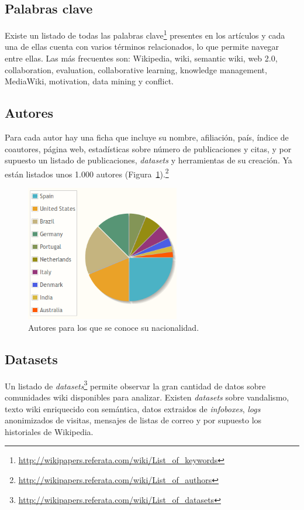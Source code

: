 \documentclass[11pt,onecolumn]{article}
\begin{document}
\subsection{Palabras clave}
Existe un listado de todas las palabras clave\footnote{\href{http://wikipapers.referata.com/wiki/List_of_keywords}{http://wikipapers.referata.com/wiki/List\_of\_keywords}} presentes en los artículos y cada una de ellas cuenta con varios términos relacionados, lo que permite navegar entre ellas. Las más frecuentes son: Wikipedia, wiki, semantic wiki, web 2.0, collaboration, evaluation, collaborative learning, knowledge management, MediaWiki, motivation, data mining y conflict. 

\subsection{Autores}
Para cada autor hay una ficha que incluye su nombre, afiliación, país, índice de coautores, página web, estadísticas sobre número de publicaciones y citas, y por supuesto un listado de publicaciones, \emph{datasets} y herramientas de su creación. Ya están listados unos 1.000 autores (Figura~\ref{fig:autores-tarta}).\footnote{\href{http://wikipapers.referata.com/wiki/List_of_authors}{http://wikipapers.referata.com/wiki/List\_of\_authors}}

\begin{figure}[htb]
\centering
\includegraphics[width=0.6\textwidth]{autores-tarta.png}
\caption{Autores para los que se conoce su nacionalidad.}
\label{fig:autores-tarta}
\end{figure}

\subsection{Datasets}
Un listado de \emph{datasets}\footnote{\href{http://wikipapers.referata.com/wiki/List_of_datasets}{http://wikipapers.referata.com/wiki/List\_of\_datasets}} permite observar la gran cantidad de datos sobre comunidades wiki disponibles para analizar. Existen \emph{datasets} sobre vandalismo, texto wiki enriquecido con semántica, datos extraidos de \emph{infoboxes}, \emph{logs} anonimizados de visitas, mensajes de listas de correo y por supuesto los historiales de Wikipedia.
\end{document}
